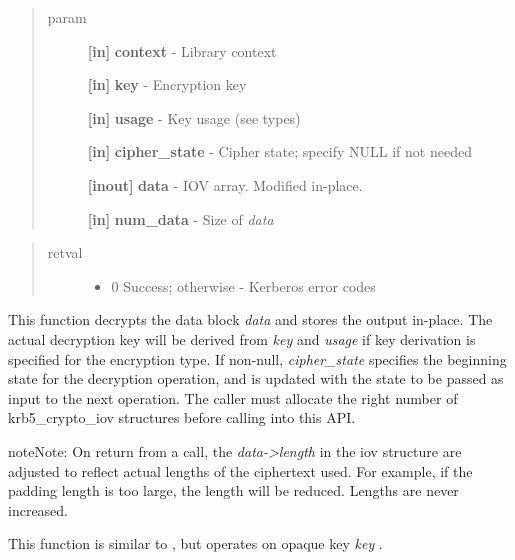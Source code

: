 \documentclass[letterpaper,10pt,english]{sphinxmanual}
\begin{document}
\begin{quote}\begin{description}
\item[{param}] \leavevmode
\textbf{{[}in{]}} \textbf{context} - Library context

\textbf{{[}in{]}} \textbf{key} - Encryption key

\textbf{{[}in{]}} \textbf{usage} - Key usage (see  types)

\textbf{{[}in{]}} \textbf{cipher\_state} - Cipher state; specify NULL if not needed

\textbf{{[}inout{]}} \textbf{data} - IOV array. Modified in-place.

\textbf{{[}in{]}} \textbf{num\_data} - Size of \emph{data}

\end{description}\end{quote}
\begin{quote}\begin{description}
\item[{retval}] \leavevmode\begin{itemize}
\item {} 
0   Success; otherwise - Kerberos error codes

\end{itemize}

\end{description}\end{quote}

This function decrypts the data block \emph{data} and stores the output in-place. The actual decryption key will be derived from \emph{key} and \emph{usage} if key derivation is specified for the encryption type. If non-null, \emph{cipher\_state} specifies the beginning state for the decryption operation, and is updated with the state to be passed as input to the next operation. The caller must allocate the right number of krb5\_crypto\_iov structures before calling into this API.




{\hyperref[appdev/refs/api/krb5_k_encrypt_iov:c.krb5_k_encrypt_iov]{}}



\begin{notice}{note}{Note:}
On return from a {\hyperref[appdev/refs/api/krb5_c_decrypt_iov:c.krb5_c_decrypt_iov]{}} call, the \emph{data-\textgreater{}length} in the iov structure are adjusted to reflect actual lengths of the ciphertext used. For example, if the padding length is too large, the length will be reduced. Lengths are never increased.

This function is similar to {\hyperref[appdev/refs/api/krb5_c_decrypt_iov:c.krb5_c_decrypt_iov]{}} , but operates on opaque key \emph{key} .
\end{notice}
\end{document}
